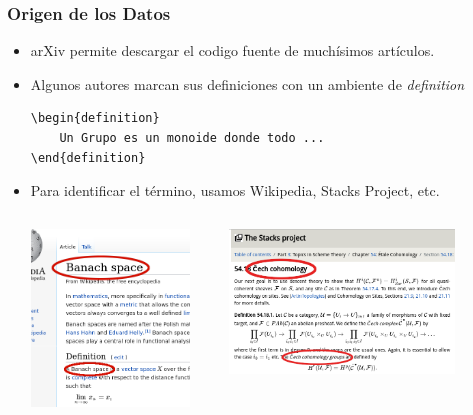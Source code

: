 \documentclass[10pt]{beamer}
\begin{document}
\begin{frame}[fragile]
    \frametitle{Origen de los Datos}
    \begin{itemize}
        \item arXiv permite descargar el codigo fuente de muchísimos artículos.
            \pause
        \item Algunos autores marcan sus definiciones con un ambiente de \emph{definition}
            \begin{verbatim}
\begin{definition}
    Un Grupo es un monoide donde todo ...
\end{definition}
    \end{verbatim}
    \pause
\item Para identificar el término, usamos Wikipedia, Stacks Project, etc.
    \begin{columns}
        \begin{column}{0.4\textwidth}
            \includegraphics[width=0.9\textwidth]{../Images/wiki_thin_banach.png}
        \end{column}
        \pause
        \begin{column}{0.6\textwidth}
            \includegraphics[width=0.8\textwidth]{../Images/stacks_defs.png}
        \end{column}
    \end{columns}


\end{itemize}
\end{frame}
\end{document}
